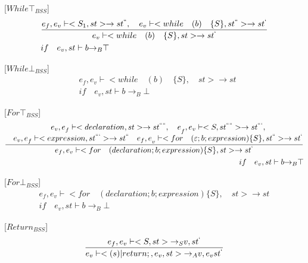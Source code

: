 [${While\top}_{BSS}$]
\begin{align*}
	&\frac { { e }_{ f },{ e }_{ v }\vdash <{ S }_{ 1 },st>\rightarrow { st }^{ `` },\quad { e }_{ v }\vdash <while\quad (b)\quad \{S\},{ st }^{ `` }>\rightarrow { st }^{ ` } }{ { e }_{ v }\vdash <while\quad (b)\quad \{S\},st>\rightarrow { st }^{ ` } }\\
	&if\quad { e }_{ v },st\vdash b{ \rightarrow  }_{ B }\top 
\end{align*}


[${While\bot}_{BSS}$]
\begin{align*}
	&{ e }_{ f },{ e }_{ v }\vdash <while\quad (b)\quad \{S\},\quad st>\rightarrow st\\
	&if\quad { e }_{ v },st\vdash b{ \rightarrow  }_{ B }\bot
\end{align*}

[${For\top}_{BSS}$]
\begin{align*}
	\frac { \quad \begin{matrix} { { e }_{ v }{ ,e }_{ f }\vdash <declaration,{ st }>\rightarrow { st }^{ ```` },\quad e }_{ f },{ e }_{ v }\vdash <{ S },{ st }^{ ```` }>\rightarrow { st }^{ ``` }, \\ { e }_{ v }{ ,e }_{ f }\vdash <expression,{ st }^{ ``` }>\rightarrow { st }^{ `` }\quad { { e }_{ f },e }_{ v }\vdash <for\quad (\varepsilon ;b;expression)\{ S\} ,{ st }^{ `` }>\rightarrow { st }^{ ` } \end{matrix} }{ { e }_{ f },{ e }_{ v }\vdash <for\quad (declaration;b;expression)\{ S\} ,st>\rightarrow { st }^{ ` } } \\ if\quad { e }_{ v },st\vdash b{ \rightarrow  }_{ B }\top  
\end{align*}

[${For\bot}_{BSS}$]
\begin{align*}
	{ e }_{ f },{ e }_{ v }\vdash <for\quad (declaration;b;expression)\{ S\} ,\quad st>\rightarrow st\\ if\quad { e }_{ v },st\vdash b{ \rightarrow  }_{ B }\bot 
\end{align*}

[${Return}_{BSS}$]
\begin{equation}
	\frac { { e }_{ f },{ e }_{ v }\vdash <{ S },st>{ \rightarrow  }_{ S }v,{ st }^{ ` } }{ { e }_{ v }\vdash <(s)|return;,{ e }_{ v },st>{ \rightarrow  }_{ A }v,{ e }_{ v }{ st }^{ ` } } 
\end{equation}


